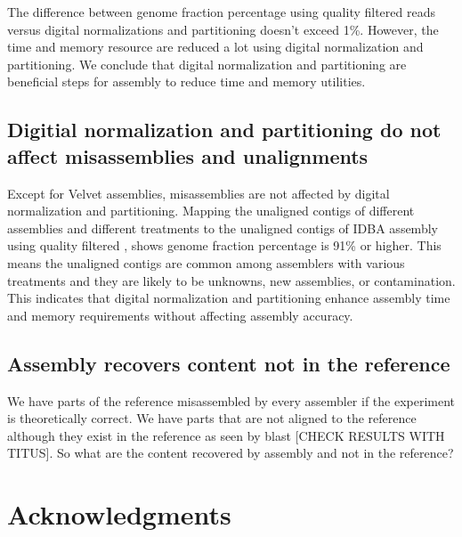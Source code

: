 The difference between genome fraction percentage using quality filtered reads versus digital normalizations and partitioning doesn't exceed 1\%. However, the time and memory resource are reduced a lot using digital normalization and partitioning. We conclude that digital normalization and partitioning are beneficial steps for assembly to reduce time and memory utilities. 
 
 \subsection*{Digitial normalization and partitioning do not  affect misassemblies and unalignments}
 
Except for Velvet assemblies, misassemblies are not affected by digital normalization and partitioning. 
Mapping the unaligned  contigs of different assemblies and different treatments to the unaligned contigs of  IDBA  assembly using quality filtered , shows genome fraction percentage is 91\% or higher. This means the unaligned contigs are common among assemblers with various treatments and they are likely to be unknowns, new assemblies, or contamination. This indicates that digital normalization and partitioning enhance assembly time and memory requirements without affecting assembly accuracy.  

\subsection*{Assembly recovers content not in the reference } 
We have parts of the reference misassembled by every assembler if the experiment is theoretically correct. 
We have parts that are not aligned to the reference although they exist in the reference as seen by blast [CHECK RESULTS WITH TITUS]. 
So what are the content recovered by assembly and not in the reference?


  

\section*{Acknowledgments}



%
%
% 


